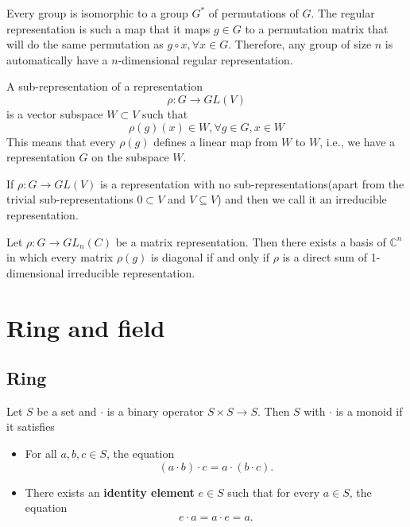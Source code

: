 \begin{refsection}
\begin{definition}
Every group is isomorphic to a group $G^*$ of permutations of $G$. The regular representation is such a map that it maps $g\in G$ to a permutation matrix that will do the same permutation as $g\circ x, \forall x \in G$. Therefore, any group of size $n$ is automatically have a $n$-dimensional regular representation.
\end{definition}



\begin{definition}
A sub-representation of a representation $$\rho:G\rightarrow GL(V)$$ is a vector subspace $W\subset V$ such that $$\rho(g)(x)\in W, \forall g \in G, x \in W$$
This means that every $\rho(g)$ defines a linear map from $W$ to $W$, i.e., we have a representation $G$ on the subspace $W$.
\end{definition}

\begin{definition}
If $\rho: G \rightarrow GL(V)$ is a representation with no sub-representations(apart from the trivial sub-representations $0\subset V$ and $V \subseteq V$) and then we call it an irreducible representation.
\end{definition}


\begin{theorem}
Let $\rho: G\rightarrow GL_n(C)$ be a matrix representation. Then there exists a basis of $\mathbb{C}^n$ in which every matrix $\rho(g)$ is diagonal if and only if $\rho$ is a direct sum of 1-dimensional irreducible representation.
\end{theorem}

\fi

\section{Ring and field}
\subsection{Ring}
\begin{definition}[monoid]
Let $S$ be a set and $\cdot$ is a binary operator $S\times S\to S$. Then $S$ with $\cdot$ is a monoid if it satisfies
\begin{itemize}
	\item For all $a,b,c\in S$, the equation 
	$$(a\cdot b)\cdot c = a\cdot (b\cdot c).$$
	\item There exists an \textbf{identity element} $e\in S$ such that for every $a\in S$, the equation
	$$e\cdot a = a\cdot e = a.$$
\end{itemize}	
\end{definition}



\end{refsection}
